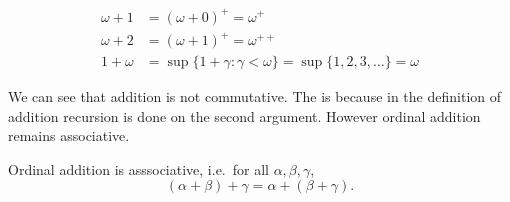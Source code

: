 \documentclass[a4paper]{article}
\begin{document}
\begin{eg}
  \begin{align*}
    \omega + 1 &= (\omega + 0)^+ = \omega^+ \\
    \omega + 2 &= (\omega + 1)^+ = \omega^{++} \\
    1 + \omega &= \sup \{1 + \gamma: \gamma < \omega\} = \sup \{1, 2, 3, \dots\} = \omega
  \end{align*}
\end{eg}

We can see that addition is not commutative. The is because in the definition of addition recursion is done on the second argument. However ordinal addition remains associative.

\begin{proposition}
  Ordinal addition is asssociative, i.e.\ for all \(\alpha, \beta, \gamma\),
  \[
    (\alpha + \beta) + \gamma = \alpha + (\beta + \gamma).
  \]
\end{proposition}
\end{document}
